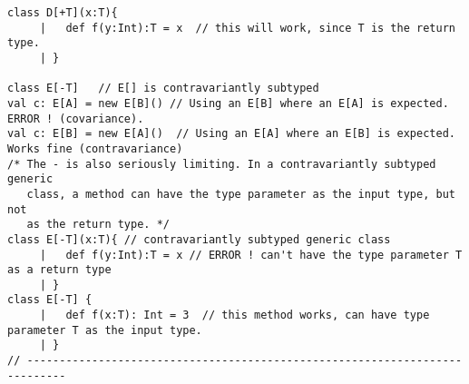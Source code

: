 \documentclass[10pt]{article}
\begin{document}
\begin{verbatim}
class D[+T](x:T){
     |   def f(y:Int):T = x  // this will work, since T is the return type.
     | }

class E[-T]   // E[] is contravariantly subtyped
val c: E[A] = new E[B]() // Using an E[B] where an E[A] is expected. ERROR ! (covariance).
val c: E[B] = new E[A]()  // Using an E[A] where an E[B] is expected. Works fine (contravariance)
/* The - is also seriously limiting. In a contravariantly subtyped generic 
   class, a method can have the type parameter as the input type, but not 
   as the return type. */
class E[-T](x:T){ // contravariantly subtyped generic class
     |   def f(y:Int):T = x // ERROR ! can't have the type parameter T as a return type
     | }
class E[-T] {  
     |   def f(x:T): Int = 3  // this method works, can have type parameter T as the input type.
     | }
// ----------------------------------------------------------------------------
\end{verbatim}
\end{document}
